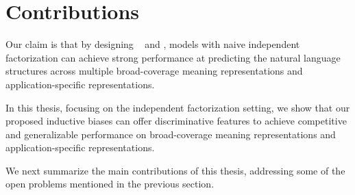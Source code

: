 \section{Contributions}
\label{sec:intro-contri}


 Our claim is that by designing
~ and , models with naive independent factorization can achieve
strong performance at predicting the natural language structures
across multiple broad-coverage meaning representations and
application-specific representations.

 In this thesis, focusing on the independent
factorization setting, we show that our proposed inductive biases can
offer discriminative features to achieve competitive and generalizable
performance on broad-coverage meaning representations and
application-specific representations.

We next summarize the main contributions of this thesis, addressing
some of the open problems mentioned in the previous section.

